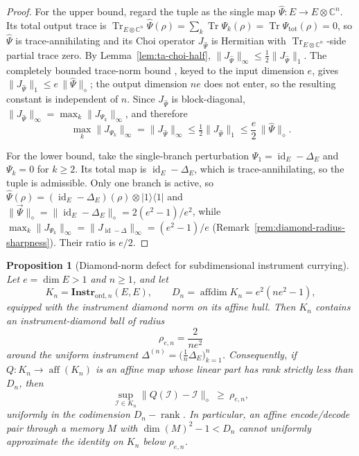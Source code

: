 \documentclass[11pt]{article}
\newtheorem{proposition}[theorem]{Proposition}
\DeclareMathOperator{\affdim}{affdim}
\DeclareMathOperator{\aff}{aff}
\DeclareMathOperator{\Tr}{Tr}
\DeclareMathOperator{\id}{id}
\DeclareMathOperator{\rank}{rank}
\begin{document}
\begin{proof}
For the upper bound, regard the tuple as the single map $\hat\Psi:E\to
E\otimes\mathbb C^n$. Its total output trace is
$\Tr_{E\otimes\mathbb C^n}\hat\Psi(\rho)=\sum_k\Tr\Psi_k(\rho)
=\Tr\Psi_{\mathrm{tot}}(\rho)=0$, so $\hat\Psi$ is trace-annihilating and its
Choi operator $J_{\hat\Psi}$ is Hermitian with $\Tr_{E\otimes\mathbb C^n}$-side
partial trace zero. By Lemma~\ref{lem:ta-choi-half},
$\|J_{\hat\Psi}\|_\infty\le\tfrac12\|J_{\hat\Psi}\|_1$. The completely bounded
trace-norm bound \cite{Watrous2018, NechitaPuchalaPawelaZyczkowski2018}, keyed
to the input dimension $e$, gives $\|J_{\hat\Psi}\|_1\le e\,\|\hat\Psi\|_\diamond$;
the output dimension $ne$ does not enter, so the resulting constant is
independent of $n$. Since $J_{\hat\Psi}$ is block-diagonal,
$\|J_{\hat\Psi}\|_\infty=\max_k\|J_{\Psi_k}\|_\infty$, and therefore
\[
\max_k\|J_{\Psi_k}\|_\infty
=\|J_{\hat\Psi}\|_\infty
\le\tfrac12\|J_{\hat\Psi}\|_1
\le\frac e2\,\|\hat\Psi\|_\diamond .
\]

For the lower bound, take the single-branch perturbation
$\Psi_1=\id_E-\Delta_E$ and $\Psi_k=0$ for $k\ge2$. Its total map is
$\id_E-\Delta_E$, which is trace-annihilating, so the tuple is admissible. Only
one branch is active, so $\hat\Psi(\rho)=(\id_E-\Delta_E)(\rho)\otimes
|1\rangle\langle1|$ and $\|\vec\Psi\|_\diamond=\|\id_E-\Delta_E\|_\diamond
=2(e^2-1)/e^2$, while $\max_k\|J_{\Psi_k}\|_\infty=\|J_{\id-\Delta}\|_\infty
=(e^2-1)/e$ (Remark~\ref{rem:diamond-radius-sharpness}). Their ratio is $e/2$.
\end{proof}

\begin{proposition}[Diamond-norm defect for subdimensional instrument currying]
\label{prop:instr-diamond-defect}
Let $e=\dim E>1$ and $n\ge1$, and let
\[
K_n=\mathbf{Instr}_{\mathrm{ord},n}(E,E),
\qquad
D_n=\affdim K_n=e^2(ne^2-1),
\]
equipped with the instrument diamond norm on its affine hull. Then $K_n$
contains an instrument-diamond ball of radius
\[
\rho_{e,n}=\frac{2}{ne^2}
\]
around the uniform instrument $\Delta^{(n)}=\bigl(\tfrac1n\Delta_E\bigr)_{k=1}^n$.
Consequently, if $Q:K_n\to\aff(K_n)$ is an affine map whose linear part has
rank strictly less than $D_n$, then
\[
\sup_{\mathcal I\in K_n}\|Q(\mathcal I)-\mathcal I\|_\diamond\ \ge\ \rho_{e,n},
\]
uniformly in the codimension $D_n-\rank$. In particular, an affine
encode/decode pair through a memory $M$ with $\dim(M)^2-1<D_n$ cannot uniformly
approximate the identity on $K_n$ below $\rho_{e,n}$.
\end{proposition}
\end{document}
